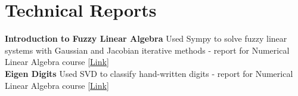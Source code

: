 
\section{Technical Reports}
\textbf{Introduction to Fuzzy Linear Algebra} Used Sympy to solve fuzzy linear systems with Gaussian and Jacobian iterative methods - report for Numerical Linear Algebra course [\href{https://github.com/mehrdad3301/fuzzy-linear-algebra}{Link}] \\ 
\textbf{Eigen Digits} Used SVD to classify hand-written digits - report for Numerical Linear Algebra course [\href{https://github.com/mehrdad3301/Eigen-Digits}{Link}] 